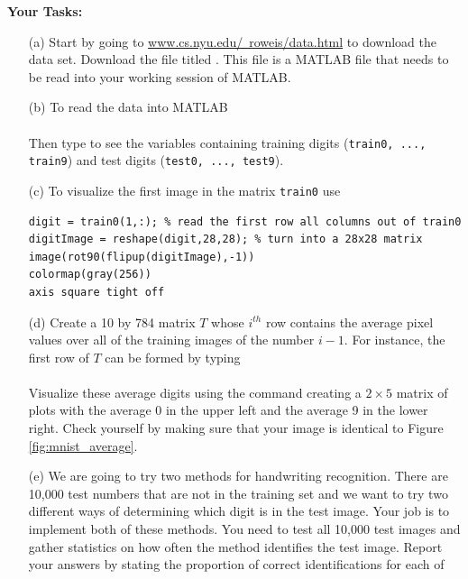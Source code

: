 \begin{problem}
    {\bf Your Tasks:}
    \begin{enumerate}
        \item[(a)] Start by going to
            \href{http://www.cs.nyu.edu/~roweis/data.html}{www.cs.nyu.edu/~roweis/data.html}
            to download the data set.  Download the file titled .
            This file is a MATLAB file that needs to be read into your working session of
            MATLAB.  
        \item[(b)] To read the  data into MATLAB \\
            \\
            Then type  to see the variables containing training digits
            (\texttt{train0, ..., train9}) and test digits (\texttt{test0, ...,
            test9}).
        \item[(c)] To visualize the first image in the matrix \texttt{train0} use 
\begin{lstlisting}
digit = train0(1,:); % read the first row all columns out of train0
digitImage = reshape(digit,28,28); % turn into a 28x28 matrix
image(rot90(flipup(digitImage),-1))
colormap(gray(256))
axis square tight off
\end{lstlisting}
        \item[(d)] Create a 10 by 784 matrix $T$ whose $i^{th}$ row contains the average
            pixel values over all of the training images of the number $i-1$.  For
            instance, the first row of $T$ can be formed by typing \\
             \\
            Visualize these average digits using the  command creating a
            $2 \times 5$ matrix of plots with the average 0 in the upper left and the
            average 9 in the lower right.  Check yourself by making sure that your image
            is identical to Figure \ref{fig:mnist_average}.
        \item[(e)] We are going to try two methods for handwriting recognition.  There are
            10,000 test numbers that are not in the training set and we want to try two
            different ways of determining which digit is in the test image.  Your job is
            to implement both of these methods.  You need to test all 10,000 test images and
            gather statistics on how often the method identifies the test image.  Report
            your answers by stating the proportion of correct identifications for each of

\end{enumerate}
\end{problem}
